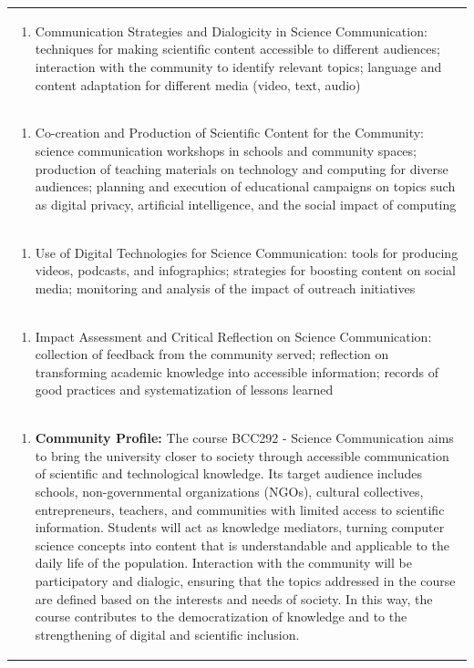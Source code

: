 \documentclass[11pt]{article}
\begin{document}
\begin{center}
\begin{longtable}{|p{4cm}|p{4cm}|p{4cm}|p{4cm}|}
\multicolumn{4}{|p{\dimexpr 16cm + 6\tabcolsep\relax}|}{\begin{enumerate}[start=2]\item Communication Strategies and Dialogicity in Science Communication: techniques for making scientific content accessible to different audiences; interaction with the community to identify relevant topics; language and content adaptation for different media (video, text, audio)\end{enumerate}}\\
\multicolumn{4}{|p{\dimexpr 16cm + 6\tabcolsep\relax}|}{\begin{enumerate}[start=3]\item Co-creation and Production of Scientific Content for the Community: science communication workshops in schools and community spaces; production of teaching materials on technology and computing for diverse audiences; planning and execution of educational campaigns on topics such as digital privacy, artificial intelligence, and the social impact of computing\end{enumerate}}\\
\multicolumn{4}{|p{\dimexpr 16cm + 6\tabcolsep\relax}|}{\begin{enumerate}[start=4]\item Use of Digital Technologies for Science Communication: tools for producing videos, podcasts, and infographics; strategies for boosting content on social media; monitoring and analysis of the impact of outreach initiatives\end{enumerate}}\\
\multicolumn{4}{|p{\dimexpr 16cm + 6\tabcolsep\relax}|}{\begin{enumerate}[start=5]\item Impact Assessment and Critical Reflection on Science Communication: collection of feedback from the community served; reflection on transforming academic knowledge into accessible information; records of good practices and systematization of lessons learned\end{enumerate}}\\
\multicolumn{4}{|p{\dimexpr 16cm + 6\tabcolsep\relax}|}{\begin{enumerate}[start=6]\item \textbf{Community Profile:} The course BCC292 - Science Communication aims to bring the university closer to society through accessible communication of scientific and technological knowledge. Its target audience includes schools, non-governmental organizations (NGOs), cultural collectives, entrepreneurs, teachers, and communities with limited access to scientific information. Students will act as knowledge mediators, turning computer science concepts into content that is understandable and applicable to the daily life of the population. Interaction with the community will be participatory and dialogic, ensuring that the topics addressed in the course are defined based on the interests and needs of society. In this way, the course contributes to the democratization of knowledge and to the strengthening of digital and scientific inclusion.\end{enumerate}}\\

\end{longtable}
\end{center}
\end{document}
